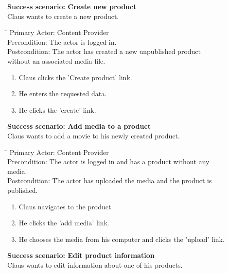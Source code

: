 \textbf{Success scenario: Create new product} \\
Claus wants to create a new product. 
\begin{tabbing}
\hspace{5mm}\=\hspace{26mm}\=\kill
\>Primary Actor:\> Content Provider\\
\>Precondition:\> The actor is logged in.\\
\>Postcondition:\> The actor has created a new unpublished product\\ \hspace{85px} without an associated media file.
\end{tabbing}
\begin{enumerate} \setlength{\itemsep}{-1mm}
	\item Claus clicks the 'Create product' link.
	\item He enters the requested data.
	\item He clicks the 'create' link.
\end{enumerate}
\vspace{3mm}
\textbf{Success scenario: Add media to a product} \\
Claus wants to add a movie to his newly created product.
\begin{tabbing}
\hspace{5mm}\=\hspace{26mm}\=\kill
\>Primary Actor:\> Content Provider\\
\>Precondition:\> The actor is logged in and has a product without any\\ \hspace{85px} media.\\
\>Postcondition:\> The actor has uploaded the media and the product is\\ \hspace{85px} published.
\end{tabbing}
\begin{enumerate} \setlength{\itemsep}{-1mm}
	\item Claus navigates to the product.
	\item He clicks the 'add media' link.
	\item He chooses the media from his computer and clicks the 'upload' link.
\end{enumerate}
\vspace{3mm}
\textbf{Success scenario: Edit product information} \\
Claus wants to edit information about one of his products.
